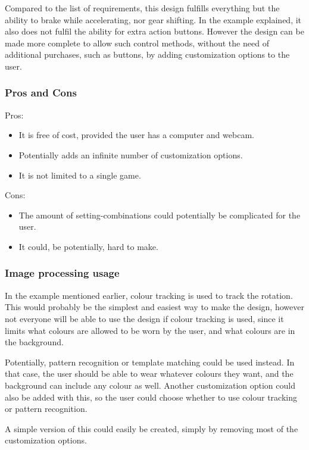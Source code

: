 Compared to the list of requirements, this design fulfills everything but the ability to brake while accelerating, nor gear shifting. In the example explained, it also does not fulfil the ability for extra action buttons. However the design can be made more complete to allow such control methods, without the need of additional purchases, such as buttons, by adding customization options to the user.


\pagebreak[2]
\subsubsection*{Pros and Cons}
Pros:
\begin{itemize}
\item It is free of cost, provided the user has a computer and webcam.
\item Potentially adds an infinite number of customization options.
\item It is not limited to a single game.
\end{itemize}
Cons:
\begin{itemize}
\item The amount of setting-combinations could potentially be complicated for the user.
\item It could, be potentially, hard to make.
\end{itemize}

\subsubsection*{Image processing usage}
In the example mentioned earlier, colour tracking is used to track the rotation. This would probably be the simplest and easiest way to make the design, however not everyone will be able to use the design if colour tracking is used, since it limits what colours are allowed to be worn by the user, and what colours are in the background.

Potentially, pattern recognition or template matching could be used instead. In that case, the user should be able to wear whatever colours they want, and the background can include any colour as well. Another customization option could also be added with this, so the user could choose whether to use colour tracking or pattern recognition.

A simple version of this could easily be created, simply by removing most of the customization options.
